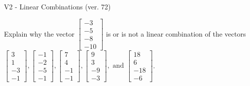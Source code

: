 \begin{exercise}
  \begin{exerciseTitle}V2 - Linear Combinations (ver. 72)\end{exerciseTitle}
  \begin{exerciseStatement}
    Explain why the vector \(\left[\begin{array}{c}
-3 \\
-5 \\
-8 \\
-10
\end{array}\right]\)  is or is not a linear 
	combination of the vectors \(\left[\begin{array}{c}
3 \\
1 \\
-3 \\
-1
\end{array}\right] , \left[\begin{array}{c}
-1 \\
-2 \\
-5 \\
-1
\end{array}\right] , \left[\begin{array}{c}
7 \\
4 \\
-1 \\
-1
\end{array}\right] , \left[\begin{array}{c}
9 \\
3 \\
-9 \\
-3
\end{array}\right] , \text{ and } \left[\begin{array}{c}
18 \\
6 \\
-18 \\
-6
\end{array}\right]\).
	



\end{exerciseStatement}
\end{exercise}
